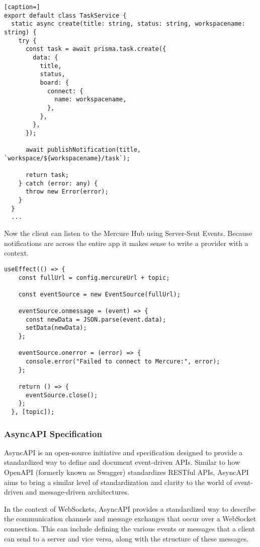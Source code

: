 \begin{lstlisting}[caption=]
export default class TaskService {
  static async create(title: string, status: string, workspacename: string) {
    try {
      const task = await prisma.task.create({
        data: {
          title,
          status,
          board: {
            connect: {
              name: workspacename,
            },
          },
        },
      });

      await publishNotification(title, `workspace/${workspacename}/task`);

      return task;
    } catch (error: any) {
      throw new Error(error);
    }
  }
  ...
\end{lstlisting}

Now the client can listen to the Mercure Hub using Server-Sent Events. Because notifications are across the entire app it makes sense to write a provider with a context.

\begin{lstlisting}[caption=EventSource listening to the topic]
  useEffect(() => {
    const fullUrl = config.mercureUrl + topic;

    const eventSource = new EventSource(fullUrl);

    eventSource.onmessage = (event) => {
      const newData = JSON.parse(event.data);
      setData(newData);
    };

    eventSource.onerror = (error) => {
      console.error("Failed to connect to Mercure:", error);
    };

    return () => {
      eventSource.close();
    };
  }, [topic]);
\end{lstlisting}

\subsubsection{AsyncAPI Specification}

AsyncAPI is an open-source initiative and specification designed to provide a standardized way to define and document event-driven APIs. Similar to how OpenAPI (formerly known as Swagger) standardizes RESTful APIs, AsyncAPI aims to bring a similar level of standardization and clarity to the world of event-driven and message-driven architectures. \cite{asyncapi}

In the context of WebSockets, AsyncAPI provides a standardized way to describe the communication channels and message exchanges that occur over a WebSocket connection. This can include defining the various events or messages that a client can send to a server and vice versa, along with the structure of these messages.

